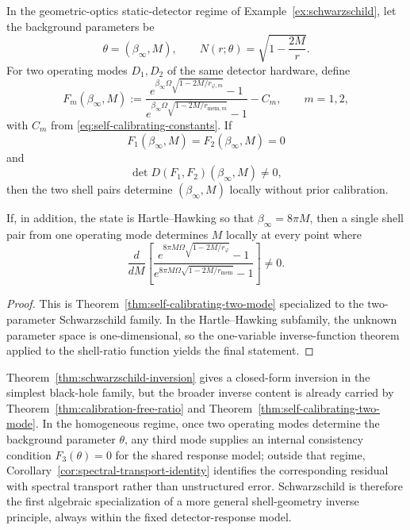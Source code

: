 \begin{corollary}\label{cor:self-calibrating-schwarzschild}
In the geometric-optics static-detector regime of Example~\ref{ex:schwarzschild}, let the background parameters be
\[
\theta=(\beta_\infty,M),
\qquad
N(r;\theta)=\sqrt{1-\frac{2M}{r}}.
\]
For two operating modes $D_1,D_2$ of the same detector hardware, define
\begin{equation}\label{eq:self-calibrating-schwarzschild-functions}
F_m(\beta_\infty,M)
:=
\frac{
e^{\beta_\infty\Omega\sqrt{1-2M/r_{\varphi,m}}}-1
}{
e^{\beta_\infty\Omega\sqrt{1-2M/r_{{\mathrm{mem}},m}}}-1
}
-C_m,
\qquad
m=1,2,
\end{equation}
with $C_m$ from \eqref{eq:self-calibrating-constants}. If
\[
F_1(\beta_\infty,M)=F_2(\beta_\infty,M)=0
\]
and
\[
\det D(F_1,F_2)(\beta_\infty,M)\neq 0,
\]
then the two shell pairs determine $(\beta_\infty,M)$ locally without prior calibration.

If, in addition, the state is Hartle--Hawking so that $\beta_\infty=8\pi M$, then a single shell pair from one operating mode determines $M$ locally at every point where
\begin{equation}\label{eq:self-calibrating-hh-derivative}
\frac{d}{dM}
\left[
\frac{
e^{8\pi M\Omega\sqrt{1-2M/r_\varphi}}-1
}{
e^{8\pi M\Omega\sqrt{1-2M/r_{\mathrm{mem}}}}-1
}
\right]
\neq 0.
\end{equation}
\end{corollary}

\begin{proof}
This is Theorem~\ref{thm:self-calibrating-two-mode} specialized to the two-parameter Schwarzschild family. In the Hartle--Hawking subfamily, the unknown parameter space is one-dimensional, so the one-variable inverse-function theorem applied to the shell-ratio function yields the final statement.
\end{proof}

\begin{remark}\label{rem:inverse-hierarchy}
Theorem~\ref{thm:schwarzschild-inversion} gives a closed-form inversion in the simplest black-hole family, but the broader inverse content is already carried by Theorem~\ref{thm:calibration-free-ratio} and Theorem~\ref{thm:self-calibrating-two-mode}. In the homogeneous regime, once two operating modes determine the background parameter $\theta$, any third mode supplies an internal consistency condition $F_3(\theta)=0$ for the shared response model; outside that regime, Corollary~\ref{cor:spectral-transport-identity} identifies the corresponding residual with spectral transport rather than unstructured error. Schwarzschild is therefore the first algebraic specialization of a more general shell-geometry inverse principle, always within the fixed detector-response model.
\end{remark}


